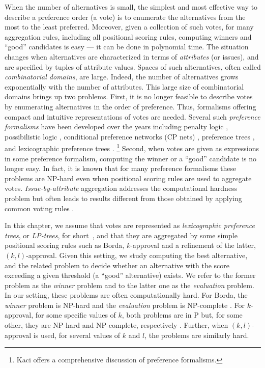 When the number of alternatives is small, the simplest and most effective 
way to describe a preference order (a vote) is to enumerate the
alternatives from the most to the least preferred. Moreover, given a 
collection of such votes, for many aggregation rules, including all 
positional scoring rules, computing winners and ``good'' candidates is 
easy --- it can be done in polynomial time. The situation changes when
alternatives are characterized in terms of \emph{attributes} (or issues),
and are specified by tuples of attribute values. Spaces of such alternatives,
often called \emph{combinatorial domains}, are large. Indeed, the number 
of alternatives grows exponentially with the number of attributes. This
large size of combinatorial domains brings up two problems. First, it is
no longer feasible to describe votes by enumerating alternatives in the
order of preference. Thus, formalisms offering compact and intuitive
representations of votes are needed. Several such \emph{preference
formalisms} have been developed over the years including penalty logic 
\cite{de1994penalty}, possibilistic logic \cite{DuboisLP91}, conditional
preference networks (CP nets) \cite{bbdh03}, preference
trees \cite{fraser1994ordinal,liu2015reasoning}, 
and lexicographic preference trees \cite{booth:learningLP}.%
\footnote{Kaci \cite{Kaci:Pref} offers a comprehensive discussion of 
preference formalisms.} Second, when votes are given as expressions in 
some preference formalism, computing the winner or a ``good'' candidate 
is no longer easy. In fact, it is known that for many preference formalisms 
these problems are NP-hard even when positional scoring rules are used 
to aggregate votes. \emph{Issue-by-attribute} aggregation addresses the
computational hardness problem but often leads to results different from 
those obtained by applying common voting rules \cite{fargier:ibi}.
  
In this chapter, we assume that votes are represented as \emph{lexicographic
preference trees}, or \emph{LP-trees}, for short~\cite{booth:learningLP},
and that they are aggregated by some simple positional scoring rules such 
as Borda, $k$-approval and a refinement of the latter, $(k,l)$-approval.
Given this setting, we study computing the best alternative, and the related 
problem to decide whether an alternative with the score exceeding a given 
threshold (a ``good'' alternative) exists. We refer to the former problem 
as the \emph{winner} problem and to the latter one as 
the \emph{evaluation} problem. In our setting, these problems are often
computationally hard. For Borda, the \emph{winner} problem is NP-hard and 
the \emph{evaluation} problem is NP-complete \cite{lang:aggLP}. For $k$-approval, 
for some specific values of $k$, both problems are in P but, for some other, 
they are NP-hard and NP-complete, respectively \cite{lang:aggLP}. Further,
when $(k,l)$-approval is used, for several values 
of $k$ and $l$, the problems are similarly hard.


